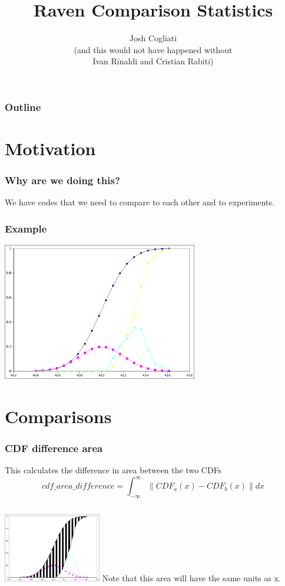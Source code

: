 \documentclass{beamer}
\title{Raven Comparison Statistics}
\author{Josh Cogliati\\ (and this would not have happened without\\ Ivan Rinaldi and Cristian Rabiti)}
\begin{document}
\begin{frame}
  \titlepage
\end{frame}

\begin{frame}
  \frametitle{Outline}
  \tableofcontents
\end{frame}

\section{Motivation}

\begin{frame}
  \frametitle{Why are we doing this?}
  We have codes that we need to compare to each other and to experiments.
\end{frame}

\begin{frame}
  \frametitle{Example}
  \includegraphics[height=6cm]{example}
\end{frame}

\section{Comparisons}

\begin{frame}
  \frametitle{CDF difference area}
  This calculates the difference in area between the two CDFs
  \begin{equation}
    cdf\_area\_difference = \int_{-\infty}^{\infty}{\|CDF_a(x)-CDF_b(x)\|dx}
  \end{equation}
  \begin{columns}
    \includegraphics[height=3cm]{example_cdf_area}
    Note that this area will have the same units as x.
  \end{columns}
\end{frame}
\end{document}
